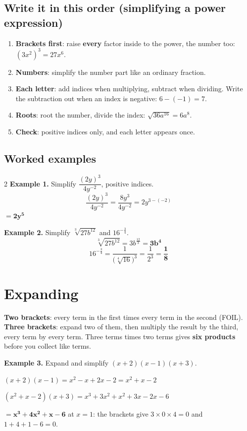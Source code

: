 \documentclass[11pt]{article}
\begin{document}
\subsection*{Write it in this order (simplifying a power expression)}
\begin{enumerate}
\item \textbf{Brackets first}: raise \textbf{every} factor inside to the power, the number too: $(3x^{2})^{3} = 27x^{6}$.
\item \textbf{Numbers}: simplify the number part like an ordinary fraction.
\item \textbf{Each letter}: add indices when multiplying, subtract when dividing. Write the subtraction out when an index is negative: $6-(-1) = 7$.
\item \textbf{Roots}: root the number, divide the index: $\sqrt{36a^{16}} = 6a^{8}$.
\item \textbf{Check}: positive indices only, and each letter appears once.
\end{enumerate}

\subsection*{Worked examples}
\begin{multicols}{2}
\textbf{Example 1.} Simplify $\dfrac{(2y)^{3}}{4y^{-2}}$, positive indices.
\[ \frac{(2y)^{3}}{4y^{-2}} = \frac{8y^{3}}{4y^{-2}} = 2y^{3-(-2)} \]
$= \mathbf{2y^{5}}$ 
\columnbreak

\textbf{Example 2.} Simplify $\sqrt[3]{27b^{12}}$ and $16^{-\frac{3}{4}}$.
\[ \sqrt[3]{27b^{12}} = 3b^{\frac{12}{3}} = \mathbf{3b^{4}} \]
\[ 16^{-\frac{3}{4}} = \frac{1}{\bigl(\sqrt[4]{16}\bigr)^{3}} = \frac{1}{2^{3}} = \mathbf{\frac{1}{8}} \]
\end{multicols}

\section{Expanding}\label{h:expand}
\textbf{Two brackets}: every term in the first times every term in the second (FOIL). \textbf{Three brackets}: expand two of them, then multiply the result by the third, every term by every term. Three terms times two terms gives \textbf{six products} before you collect like terms.

\textbf{Example 3.} Expand and simplify $(x+2)(x-1)(x+3)$.\par
{} $(x+2)(x-1) = x^{2} - x + 2x - 2 = x^{2} + x - 2$\par
{} $(x^{2}+x-2)(x+3) = x^{3} + 3x^{2} + x^{2} + 3x - 2x - 6$\par
{} $= \mathbf{x^{3} + 4x^{2} + x - 6}$ 
 at $x = 1$: the brackets give $3 \times 0 \times 4 = 0$ and $1 + 4 + 1 - 6 = 0$.\par
\end{document}
